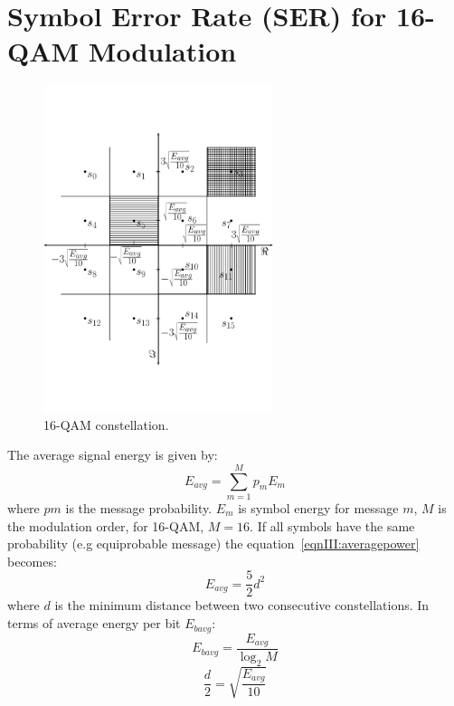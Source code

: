 \chapter{Symbol Error Rate (SER) for 16-QAM Modulation} \label{appendC}

\begin{figure}[!h]
\centering
\includegraphics[width=0.6\textwidth]{./append3/SER16QAM}
\caption{16-QAM constellation.}
\label{figIII:QAM_const}
\end{figure}
The average signal energy is given by:
\begin{equation}\label{eqnIII:averagepower}
	E_{avg}=\sum\limits_{m=1}^{M}p_mE_m
\end{equation}
where $ pm $ is the message probability. $ E_m $ is symbol energy for message $ m $, $ M $ is the modulation order, for 16-QAM, $M=16  $. If all symbols have the same probability (e.g equiprobable message) the equation~\eqref{eqnIII:averagepower} becomes:
  \begin{equation}
  E_{avg}=\dfrac{5}{2}d^2
  \end{equation}
  where $ d $ is the minimum distance between two consecutive constellations. In terms of average energy per bit $ E_{bavg} $:
  \begin{equation}
  E_{bavg}=\dfrac{E_{avg}}{\log_2M}
  \end{equation}
  \begin{equation}
  \dfrac{d}{2}= \sqrt{\dfrac{E_{avg}}{10}}
  \end{equation}
  
